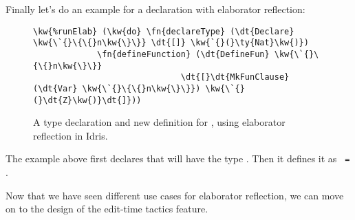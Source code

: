 Finally let's do an example for a declaration with elaborator reflection:

\begin{figure}[ht]
  \caption{A type declaration and new definition for , using elaborator reflection in Idris.}
\begin{Verbatim}[framesep=2mm, label=\footnotesize{\normalfont{Idris}}, labelposition=topline]
\kw{%runElab} (\kw{do} \fn{declareType} (\dt{Declare} \kw{\`{}\{\{}n\kw{\}\}} \dt{[]} \kw{`{}(}\ty{Nat}\kw{)})
             \fn{defineFunction} (\dt{DefineFun} \kw{\`{}\{\{}n\kw{\}\}}
                              \dt{[}\dt{MkFunClause} (\dt{Var} \kw{\`{}\{\{}n\kw{\}\}}) \kw{\`{}(}\dt{Z}\kw{)}\dt{]}))
\end{Verbatim}
\end{figure}

The example above first declares that  will have the type .
Then it defines it as \texttt{ = }.

Now that we have seen different use cases for elaborator reflection, we can move on to the
design of the edit-time tactics feature.



